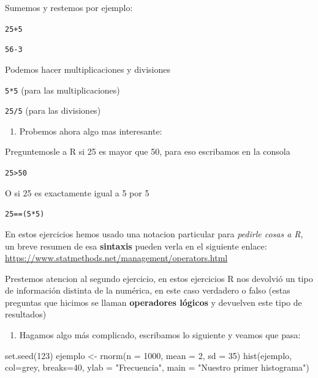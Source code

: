 \documentclass[
]{book}
\newenvironment{Shaded}{\begin{snugshade}}{\end{snugshade}}
\newcommand{\AttributeTok}[1]{\textcolor[rgb]{0.77,0.63,0.00}{#1}}
\newcommand{\DecValTok}[1]{\textcolor[rgb]{0.00,0.00,0.81}{#1}}
\newcommand{\FunctionTok}[1]{\textcolor[rgb]{0.00,0.00,0.00}{#1}}
\newcommand{\NormalTok}[1]{#1}
\newcommand{\OtherTok}[1]{\textcolor[rgb]{0.56,0.35,0.01}{#1}}
\newcommand{\StringTok}[1]{\textcolor[rgb]{0.31,0.60,0.02}{#1}}
\providecommand{\tightlist}{%
  \setlength{\itemsep}{0pt}\setlength{\parskip}{0pt}}
\begin{document}
Sumemos y restemos por ejemplo:

\texttt{25+5}

\texttt{56-3}

Podemos hacer multiplicaciones y divisiones

\texttt{5*5} (para las multiplicaciones)

\texttt{25/5} (para las divisiones)

\begin{enumerate}
\def\labelenumi{\arabic{enumi}.}
\setcounter{enumi}{1}
\tightlist
\item
  Probemos ahora algo mas interesante:
\end{enumerate}

Preguntemosle a R si 25 es mayor que 50, para eso escribamos en la consola

\texttt{25\textgreater{}50}

O si 25 es exactamente igual a 5 por 5

\texttt{25==(5*5)}

En estos ejercicios hemos usado una notacion particular para \emph{pedirle cosas a R}, un breve resumen de esa \textbf{sintaxis} pueden verla en el siguiente enlace:
\url{https://www.statmethods.net/management/operators.html}

Prestemos atencion al segundo ejercicio, en estos ejercicios R nos devolvió un tipo de información distinta de la numérica, en este caso verdadero o falso (estas preguntas que hicimos se llaman \textbf{operadores lógicos} y devuelven este tipo de resultados)

\begin{enumerate}
\def\labelenumi{\arabic{enumi}.}
\setcounter{enumi}{2}
\tightlist
\item
  Hagamos algo más complicado, escribamos lo siguiente y veamos que pasa:
\end{enumerate}

\begin{Shaded}
\begin{Highlighting}[]
\FunctionTok{set.seed}\NormalTok{(}\DecValTok{123}\NormalTok{)}
\NormalTok{ejemplo }\OtherTok{\textless{}{-}} \FunctionTok{rnorm}\NormalTok{(}\AttributeTok{n =} \DecValTok{1000}\NormalTok{, }\AttributeTok{mean =} \DecValTok{2}\NormalTok{, }\AttributeTok{sd =} \DecValTok{35}\NormalTok{)}
\FunctionTok{hist}\NormalTok{(ejemplo, }\AttributeTok{col=}\StringTok{\textquotesingle{}grey\textquotesingle{}}\NormalTok{, }\AttributeTok{breaks=}\DecValTok{40}\NormalTok{, }
     \AttributeTok{ylab =} \StringTok{"Frecuencia"}\NormalTok{, }\AttributeTok{main =} \StringTok{"Nuestro primer histograma"}\NormalTok{)}
\end{Highlighting}
\end{Shaded}
\end{document}
